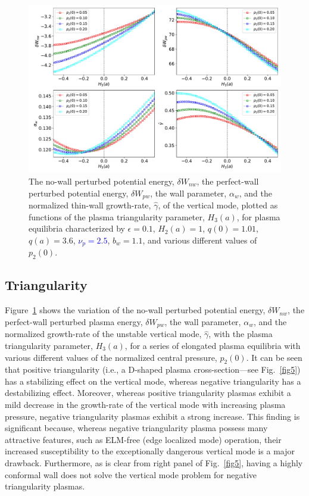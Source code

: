 \documentclass[12pt,prb,aps]{revtex4-1}
\begin{document}
\begin{figure}
\centerline{\includegraphics[width=\textwidth]{Fig4.pdf}}
\caption{The no-wall perturbed potential energy, $\delta W_{nw}$, the perfect-wall perturbed potential energy, $\delta W_{pw}$, the wall
parameter, $\alpha_w$, and the normalized thin-wall growth-rate, $\hat{\gamma}$,  of the  vertical  mode, plotted as  functions of the
plasma triangularity parameter, $H_3(a)$, for plasma equilibria characterized by  $\epsilon=0.1$, $H_2(a)=1$, $q(0)=1.01$, $q(a)=3.6$,  \textcolor{blue}{$\nu_p=2.5$}, $b_w=1.1$, and
various different values of $p_2(0)$.  \label{fig4}}
\end{figure}

\subsection{Triangularity}
Figure~\ref{fig4} shows the variation of the no-wall perturbed potential energy, $\delta W_{nw}$, the perfect-wall perturbed plasma energy, $\delta W_{pw}$, the wall 
parameter, $\alpha_w$, and the normalized growth-rate of the unstable vertical mode, $\hat{\gamma}$, with the plasma triangularity parameter, $H_3(a)$,  for a series of
elongated plasma equilibria with various different values of the normalized central pressure, $p_2(0)$. It can be seen that
positive triangularity (i.e., a D-shaped plasma cross-section---see Fig.~\ref{fig5}) has a stabilizing effect on the vertical mode, whereas negative triangularity has
a destabilizing effect. Moreover, whereas positive triangularity plasmas exhibit a mild decrease in the growth-rate of the vertical mode with increasing plasma
pressure,\cite{ward} negative triangularity plasmas exhibit a strong increase.\cite{guz} This finding is significant because, whereas negative triangularity plasma possess many attractive features,
such as ELM-free (edge localized mode) operation,\cite{guz} their increased susceptibility to the exceptionally dangerous vertical  mode is a major drawback. 
Furthermore, as is clear from right panel of Fig.~\ref{fig5}, having a highly conformal wall does not solve the vertical mode problem for negative triangularity plasmas. 
\end{document}
